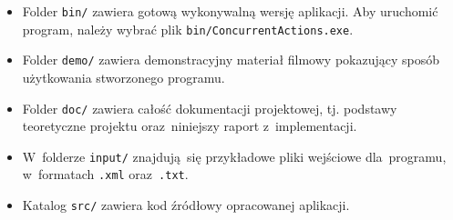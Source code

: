 \documentclass[11pt,a4paper]{article}
\begin{document}
\begin{itemize}
    \item Folder \verb+bin/+ zawiera gotową wykonywalną wersję aplikacji.
    Aby uruchomić program, należy wybrać plik \verb+bin/ConcurrentActions.exe+.
    \item Folder \verb+demo/+ zawiera demonstracyjny materiał filmowy pokazujący sposób użytkowania stworzonego programu.
    \item Folder \verb+doc/+ zawiera całość dokumentacji projektowej, tj. podstawy teoretyczne projektu oraz~niniejszy raport z~implementacji.
    \item W~folderze \verb+input/+ znajdują~się przykładowe pliki wejściowe dla~programu, w~formatach \verb+.xml+ oraz~\verb+.txt+.
    \item Katalog \verb+src/+ zawiera kod źródłowy opracowanej aplikacji.
\end{itemize}
\end{document}
